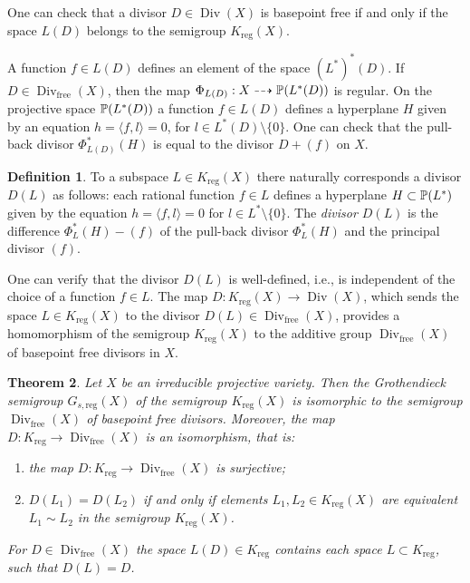 \documentclass[11pt]{article}
\theoremstyle{plain}
\newtheorem{theorem}{Theorem}[section]
\theoremstyle{definition}
\newtheorem{definition}[theorem]{Definition}
\newcommand\Div{\operatorname{Div}}
\begin{document}
One can check that a divisor $D\in \Div (X)$ is basepoint free if and only if the space $L(D)$ belongs to the semigroup $K_\mathrm{reg}(X)$.

A function $f\in L(D)$ defines  an element of   the space $(L^*)^*(D)$. If $D\in \Div_\mathrm{free}(X)$, then the map $\Phi_{L(D)}:X\dashrightarrow   \Bbb P(L^*(D))$   is regular. On the projective space $\Bbb P(L^*(D))$ a function $f\in L(D)$ defines a hyperplane  $H$ given by an equation $h=\langle f, l\rangle=0$, for $l\in L^*(D)\setminus  \{0\}$. One can check that the pull-back divisor $\Phi^*_{L(D)} (H)$ is equal to the  divisor $D+(f)$ on $X$.


\begin{definition} To a subspace $L \in K_\mathrm{reg}(X)$  there naturally corresponds
a  divisor $D(L)$ as follows: each rational function $f\in L$ defines a
hyperplane $H\subset \Bbb P (L^*)$ given by the equation  $h={\langle f,l\rangle = 0}$ for $l\in L^*\setminus  \{0\}$.  The {\it divisor $D(L)$}  is the difference $\Phi_L^*(H)-(f)$ of the
pull-back divisor $\Phi_L^*(H)$ and the principal  divisor $(f)$.
\end{definition}

One can verify that the divisor $D(L)$ is well-defined, i.e., is independent of the choice of a function $f\in L$. The map $D:K_\mathrm{reg} (X)\to \Div (X)$, which sends the space $L\in K_\mathrm{reg}(X)$ to the divisor $D(L)\in \Div_\mathrm{free}(X)$, provides a homomorphism of the semigroup $K_\mathrm{reg}(X)$ to  the additive group $\Div_\mathrm{free}(X)$ of basepoint free   divisors in $X$.


\begin{theorem}\label{regularsemigroup}  Let $X$ be  an irreducible  projective variety. Then the Grothendieck semigroup $G_{s,\mathrm{reg}}(X)$ of the semigroup $K_\mathrm{reg}(X)$  is isomorphic to  the semigroup $\Div_\mathrm{free}(X)$ of basepoint free  divisors. Moreover, the map $D:K_\mathrm{reg} \to \Div_\mathrm{free}(X)$   is an isomorphism, that is:
\begin{enumerate}
\item the map $D:K_\mathrm{reg} \to \Div_\mathrm{free}(X)$ is surjective;

\item $D(L_1)=D(L_2)$  if and only if  elements $L_1,L_2\in K_\mathrm{reg}(X)$ are equivalent $L_1\sim L_2$ in the semigroup $K_\mathrm{reg}(X)$.
    \end{enumerate}
For $D\in \Div_\mathrm{free}(X)$ the space $L(D)\in K_\mathrm{reg}$ contains each space  $L\subset K_\mathrm{reg}$,  such that $D(L)=D$.
  \end{theorem}
\end{document}
